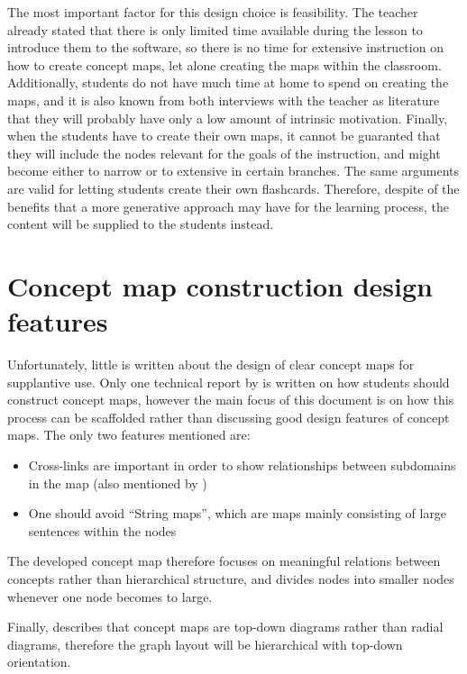 The most important factor for this design choice is feasibility. The teacher already stated that there is only limited time available during the lesson to introduce them to the software, so there is no time for extensive instruction on how to create concept maps, let alone creating the maps within the classroom. Additionally, students do not have much time at home to spend on creating the maps, and it is also known from both interviews with the teacher as literature that they will probably have only a low amount of intrinsic motivation. Finally, when the students have to create their own maps, it cannot be guaranted that they will include the nodes relevant for the goals of the instruction, and might become either to narrow or to extensive in certain branches. The same arguments are valid for letting students create their own flashcards. Therefore, despite of the benefits that a more generative approach may have for the learning process, the content will be supplied to the students instead.

    \section{Concept map construction design features}
    \label{sec:cmapframework}

Unfortunately, little is written about the design of clear concept maps for supplantive use. Only one technical report by \cite{constructcmaps} is written on how students should construct concept maps, however the main focus of this document is on how this process can be scaffolded rather than discussing good design features of concept maps. The only two features mentioned are:

\begin{itemize}
    \item Cross-links are important in order to show relationships between subdomains in the map (also mentioned by )
    \item One should avoid ``String maps'', which are maps mainly consisting of large sentences within the nodes
\end{itemize}

The developed concept map therefore focuses on meaningful relations between concepts rather than hierarchical structure, and divides nodes into smaller nodes whenever one node becomes to large.

Finally,  describes that concept maps are top-down diagrams rather than radial diagrams, therefore the graph layout will be hierarchical with top-down orientation.

